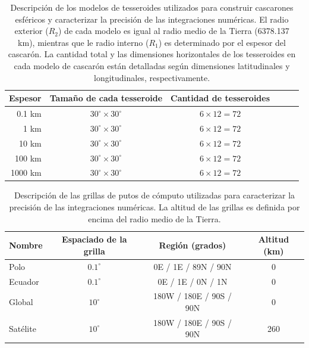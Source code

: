 \begin{table}
\caption{
    Descripción de los modelos de tesseroides utilizados para construir
    cascarones esféricos y caracterizar la precisión de las integraciones
    numéricas.
    El radio exterior ($R_2$) de cada modelo es igual al radio medio de la
    Tierra (6378.137 km), mientras que le radio interno ($R_1$) es determinado
    por el espesor del cascarón.
    La cantidad total y las dimensiones horizontales de los tesseroides en cada
    modelo de cascarón están detalladas según dimensiones latitudinales
    y longitudinales, respectivamente.
    \newline
}
\label{tab:shell-models}
\centering
\begin{tabular}{rccccc}
    Espesor & Tamaño de cada tesseroide  & Cantidad de tesseroides \\ \hline
    0.1 km  & $30^\circ \times 30^\circ$ & $6 \times 12 = 72$ \\
    1 km    & $30^\circ \times 30^\circ$ & $6 \times 12 = 72$ \\
    10 km   & $30^\circ \times 30^\circ$ & $6 \times 12 = 72$ \\
    100 km  & $30^\circ \times 30^\circ$ & $6 \times 12 = 72$ \\
    1000 km & $30^\circ \times 30^\circ$ & $6 \times 12 = 72$ \\
\end{tabular}
\end{table}

\begin{table}
\caption{
    Descripción de las grillas de putos de cómputo utilizadas para caracterizar
    la precisión de las integraciones numéricas.
    La altitud de las grillas es definida por encima del radio medio de la
    Tierra.
    \newline
}
\label{tab:grids}
\centering
\begin{tabular}{lccc}
    Nombre & Espaciado de la grilla & Región (grados) & Altitud (km)
    \\ \hline
    Polo      & $0.1^\circ$ &   0E /   1E / 89N / 90N & 0   \\
    Ecuador   & $0.1^\circ$ &   0E /   1E /  0N / 1N  & 0   \\
    Global    & $ 10^\circ$ & 180W / 180E / 90S / 90N & 0   \\
    Satélite  & $ 10^\circ$ & 180W / 180E / 90S / 90N & 260 \\
\end{tabular}
\end{table}


